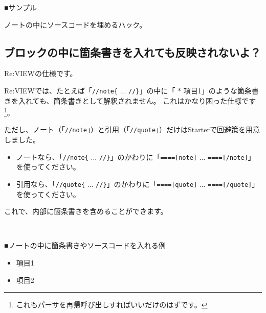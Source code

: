 \begin{starternote}{■サンプル}  %

ノートの中にソースコードを埋めるハック。

\begin{starterprogram}\end{starterprogram}
\end{starternote}  %
\vspace*{\baselineskip}

\subsection{ブロックの中に箇条書きを入れても反映されないよ？}
\label{sec:2-3-2}
\label{subsec-faq-block2}

Re:VIEWの仕様です。

Re:VIEWでは、たとえば「\texttt{//note\{} ... \texttt{//\}}」の中に「 * 項目1」のような箇条書きを入れても、箇条書きとして解釈されません。
これはかなり困った仕様です\footnote{これもパーサを再帰呼び出しすればいいだけのはずです。}。

ただし、ノート（「\texttt{//note}」）と引用（「\texttt{//quote}」）だけはStarterで回避策を用意しました。

\begin{itemize}
\item ノートなら、「\texttt{//note\{} ... \texttt{//\}}」のかわりに「\texttt{====[note]} ... \texttt{====[/note]}」を使ってください。
\item 引用なら、「\texttt{//quote\{} ... \texttt{//\}}」のかわりに「\texttt{====[quote]} ... \texttt{====[/quote]}」を使ってください。
\end{itemize}

これで、内部に箇条書きを含めることができます。

\begin{starterprogram}\end{starterprogram}
\noindent
{}\\

\begin{starternote}{■ノートの中に箇条書きやソースコードを入れる例}
\begin{starternoteinner}

\begin{itemize}
\item 項目1
\item 項目2
\end{itemize}

\end{starternoteinner}
\end{starternote}
\vspace*{\baselineskip}

